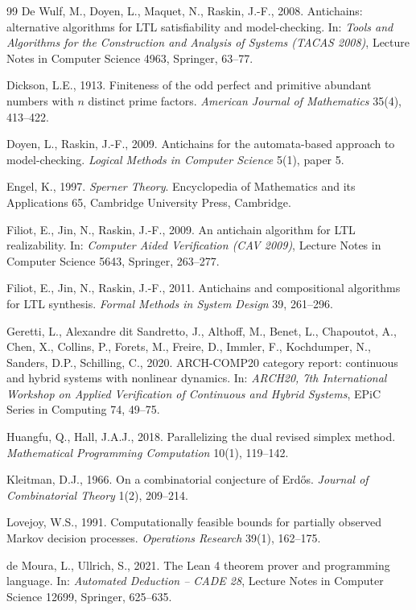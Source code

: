 \documentclass[11pt,a4paper]{article}
\theoremstyle{plain}
\theoremstyle{definition}
\theoremstyle{remark}
\begin{document}
\begin{thebibliography}{99}
 De Wulf, M., Doyen, L., Maquet, N., Raskin, J.-F., 2008. Antichains: alternative algorithms for LTL satisfiability and model-checking. In: \emph{Tools and Algorithms for the Construction and Analysis of Systems (TACAS 2008)}, Lecture Notes in Computer Science 4963, Springer, 63--77.

 Dickson, L.E., 1913. Finiteness of the odd perfect and primitive abundant numbers with $n$ distinct prime factors. \emph{American Journal of Mathematics} 35(4), 413--422.

 Doyen, L., Raskin, J.-F., 2009. Antichains for the automata-based approach to model-checking. \emph{Logical Methods in Computer Science} 5(1), paper 5.

 Engel, K., 1997. \emph{Sperner Theory}. Encyclopedia of Mathematics and its Applications 65, Cambridge University Press, Cambridge.

 Filiot, E., Jin, N., Raskin, J.-F., 2009. An antichain algorithm for LTL realizability. In: \emph{Computer Aided Verification (CAV 2009)}, Lecture Notes in Computer Science 5643, Springer, 263--277.

 Filiot, E., Jin, N., Raskin, J.-F., 2011. Antichains and compositional algorithms for LTL synthesis. \emph{Formal Methods in System Design} 39, 261--296.

 Geretti, L., Alexandre dit Sandretto, J., Althoff, M., Benet, L., Chapoutot, A., Chen, X., Collins, P., Forets, M., Freire, D., Immler, F., Kochdumper, N., Sanders, D.P., Schilling, C., 2020. ARCH-COMP20 category report: continuous and hybrid systems with nonlinear dynamics. In: \emph{ARCH20, 7th International Workshop on Applied Verification of Continuous and Hybrid Systems}, EPiC Series in Computing 74, 49--75.

 Huangfu, Q., Hall, J.A.J., 2018. Parallelizing the dual revised simplex method. \emph{Mathematical Programming Computation} 10(1), 119--142.

 Kleitman, D.J., 1966. On a combinatorial conjecture of Erd\H{o}s. \emph{Journal of Combinatorial Theory} 1(2), 209--214.

 Lovejoy, W.S., 1991. Computationally feasible bounds for partially observed Markov decision processes. \emph{Operations Research} 39(1), 162--175.

 de Moura, L., Ullrich, S., 2021. The Lean 4 theorem prover and programming language. In: \emph{Automated Deduction -- CADE 28}, Lecture Notes in Computer Science 12699, Springer, 625--635.


\end{thebibliography}
\end{document}
